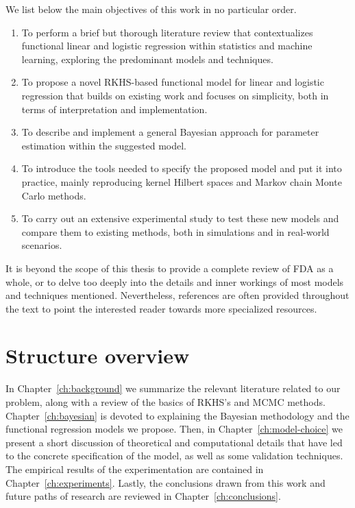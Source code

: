 We list below the main objectives of this work in no particular order.

\begin{enumerate}[1.]
  \item To perform a brief but thorough literature review that contextualizes functional linear and logistic regression within statistics and machine learning, exploring the predominant models and techniques.
  \item To propose a novel RKHS-based functional model for linear and logistic regression that builds on existing work and focuses on simplicity, both in terms of interpretation and implementation.
  \item To describe and implement a general Bayesian approach for parameter estimation within the suggested model.
  \item To introduce the tools needed to specify the proposed model and put it into practice, mainly reproducing kernel Hilbert spaces and Markov chain Monte Carlo methods.
  \item To carry out an extensive experimental study to test these new models and compare them to existing methods, both in simulations and in real-world scenarios.
\end{enumerate}

It is beyond the scope of this thesis to provide a complete review of FDA as a whole, or to delve too deeply into the details and inner workings of most models and techniques mentioned. Nevertheless, references are often provided throughout the text to point the interested reader towards more specialized resources.

\section{Structure overview}

In Chapter~\ref{ch:background} we summarize the relevant literature related to our problem, along with a review of the basics of RKHS's and MCMC methods. Chapter~\ref{ch:bayesian} is devoted to explaining the Bayesian methodology and the functional regression models we propose. Then, in Chapter~\ref{ch:model-choice} we present a short discussion of theoretical and computational details that have led to the concrete specification of the model, as well as some validation techniques. The empirical results of the experimentation are contained in Chapter~\ref{ch:experiments}. Lastly, the conclusions drawn from this work and future paths of research are reviewed in Chapter~\ref{ch:conclusions}.
